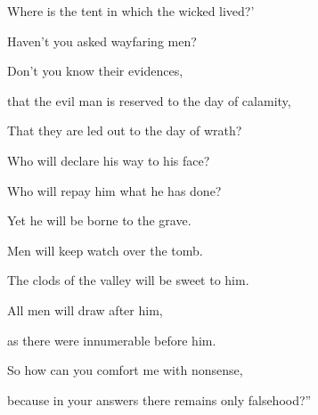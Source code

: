 {\par }{\QB Where is the tent in which the wicked lived?’
\par }{\Q {}Haven’t you asked wayfaring men?
\par }{\QB Don’t you know their evidences,
\par }{\Q {}that the evil man is reserved to the day of calamity,
\par }{\QB That they are led out to the day of wrath?
\par }{\Q {}Who will declare his way to his face?
\par }{\QB Who will repay him what he has done?
\par }{\Q {}Yet he will be borne to the grave.
\par }{\QB Men will keep watch over the tomb.
\par }{\Q {}The clods of the valley will be sweet to him.
\par }{\QB All men will draw after him,
\par }{\QB as there were innumerable before him.
\par }{\Q {}So how can you comfort me with nonsense,
\par }{\QB because in your answers there remains only falsehood?”

}
